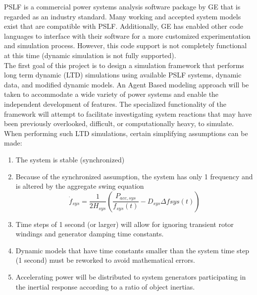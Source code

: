 \documentclass[12pt]{article}
\begin{document}
PSLF is a commercial power systems analysis software package by GE that is regarded as an industry standard. Many working and accepted system models exist that are compatible with PSLF. Additionally, GE has enabled other code languages to interface with their software for a more customized experimentation and simulation process. However, this code support is not completely functional at this time (dynamic simulation is not fully supported).\\ %

The first goal of this project is to design a simulation framework that performs long term dynamic (LTD) simulations using available PSLF systems, dynamic data, and modified dynamic models. An Agent Based modeling approach will be taken to accommodate a wide variety of power systems and enable the independent development of features. 
The specialized functionality of the framework will attempt to facilitate investigating system reactions that may have been previously overlooked, difficult, or computationally heavy, to simulate.   \\

When performing such LTD simulations, certain simplifying assumptions can be made:
\begin{enumerate}
	\item The system is stable (synchronized)
	\item Because of the synchronized assumption, the system has only 1 frequency and is altered by the aggregate swing equation
	\[ \dot{f}_{sys} = \dfrac{1}{2H_{sys} } \left( \dfrac{P_{acc, sys} }{f_{sys}(t)} - D_{sys}\Delta f{sys}(t)  \right)  \]
	\item Time steps of 1 second (or larger) will allow for ignoring transient rotor windings and generator damping time constants. 
	\item Dynamic models that have time constants smaller than the system time step (1 second) must be reworked to avoid mathematical errors.
	\item Accelerating power will be distributed to system generators participating in the inertial response according to a ratio of object inertias.
\end{enumerate}
\end{document}
